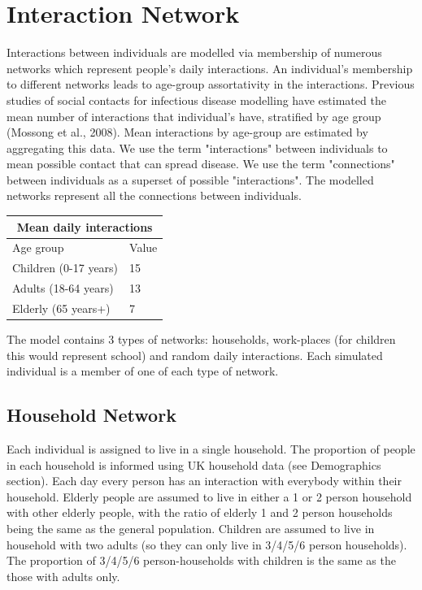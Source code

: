 \documentclass[11pt, oneside]{amsart}   	%
\begin{document}
\section{Interaction Network}

Interactions between individuals are modelled via membership of numerous networks which represent people's daily interactions.
An individual's membership to different networks leads to age-group assortativity in the interactions.
Previous studies of social contacts for infectious disease modelling have estimated the mean number of interactions that individual's have, stratified by age group (Mossong et al., 2008).
Mean interactions by age-group are estimated by aggregating this data.  We use the term "interactions" between individuals to mean possible contact that can spread disease.  We use the term "connections" between individuals as a superset of possible "interactions".  The modelled networks represent all the connections between individuals.  

\medskip \medskip
\begin{table}[!htbp]
\centering
\begin{tabular}{ |p{5cm}|p{1.5cm}|  }
 \hline
 \multicolumn{2}{|c|}{Mean daily interactions} \\
 \hline
Age group  & Value \\
 \hline
 \hline 
Children (0-17 years) & 15 \\
Adults (18-64 years) & 13 \\
Elderly (65 years+) & 7 \\
 \hline
\end{tabular}
\end{table}
\medskip \medskip

The model contains 3 types of networks: households, work-places (for children this would represent school) and random daily interactions.  Each simulated individual is a member of one of each type of network.  

\subsection{Household Network}
Each individual is assigned to live in a single household.  The proportion of people in each household is informed using UK household data (see Demographics section).
Each day every person has an interaction with everybody within their household.
Elderly people are assumed to live in either a 1 or 2 person household with other elderly people, with the ratio of elderly 1 and 2 person households being the same as the general population.
Children are assumed to live in household with two adults (so they can only live in 3/4/5/6 person households). 
The proportion of 3/4/5/6 person-households with children is the same as the those with adults only.
\end{document}
